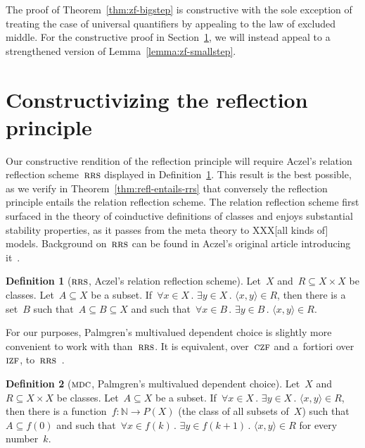 \documentclass[oneside,reqno]{amsart}
\theoremstyle{definition}
\newtheorem{defn}{Definition}[section]
\theoremstyle{plain}
\theoremstyle{remark}
\newcommand{\NN}{\mathbb{N}}
\renewcommand{\_}{\mathpunct{.}\,}
\newcommand{\?}{\,{:}\,}
\newcommand{\IZF}{\textsc{izf}}
\newcommand{\CZF}{\textsc{czf}}
\newcommand{\RRS}{\textsc{rrs}}
\newcommand{\MDC}{\textsc{mdc}}
\begin{document}
The proof of Theorem~\ref{thm:zf-bigstep} is constructive with the sole
exception of treating the case of universal quantifiers by appealing to the law
of excluded middle. For the constructive proof in
Section~\ref{sect:constructive-proof}, we will instead appeal to a strengthened
version of Lemma~\ref{lemma:zf-smallstep}.


\section{Constructivizing the reflection principle}
\label{sect:constructive-proof}

Our constructive rendition of the reflection principle will require Aczel's
relation reflection scheme~$\RRS$ displayed in Definition~\ref{defn:rrs}. This
result is the best possible, as we verify in Theorem~\ref{thm:refl-entails-rrs}
that conversely the reflection principle entails the
relation reflection scheme. The relation reflection scheme first surfaced in
the theory of coinductive definitions of classes and enjoys substantial
stability properties, as it passes from the meta theory to XXX[all kinds of]
models. Background on~$\RRS$ can be found in Aczel's original article
introducing it~\cite{aczel:rrs}.

\begin{defn}[$\RRS$, Aczel's relation reflection scheme]\label{defn:rrs}
Let~$X$ and~$R \subseteq X \times X$ be classes. Let~$A \subseteq X$ be a
subset. If~$\forall x \in X\_ \exists y \in X\_ \langle x,y \rangle \in R$,
then there is a set~$B$ such that~$A \subseteq B \subseteq X$ and such
that~$\forall x \in B\_ \exists y \in B\_ \langle x,y \rangle \in R$.
\end{defn}

For our purposes, Palmgren's multivalued dependent choice is slightly more
convenient to work with than~$\RRS$. It is equivalent, over~$\CZF$ and
a~fortiori over~$\IZF$, to~$\RRS$~\cite{palmgren:mdc}.

\begin{defn}[$\MDC$, Palmgren's multivalued dependent choice]
Let~$X$ and~$R \subseteq X \times X$ be classes. Let~$A \subseteq X$ be a
subset. If~$\forall x \in X\_ \exists y \in X\_ \langle x,y \rangle \in R$,
then there is a function~$f : \NN \to P(X)$ (the class of all subsets of~$X$)
such that~$A \subseteq f(0)$ and such that~$\forall x \in f(k)\_ \exists y \in
f(k+1)\_ \langle x,y \rangle \in R$ for every number~$k$.\end{defn}
\end{document}
